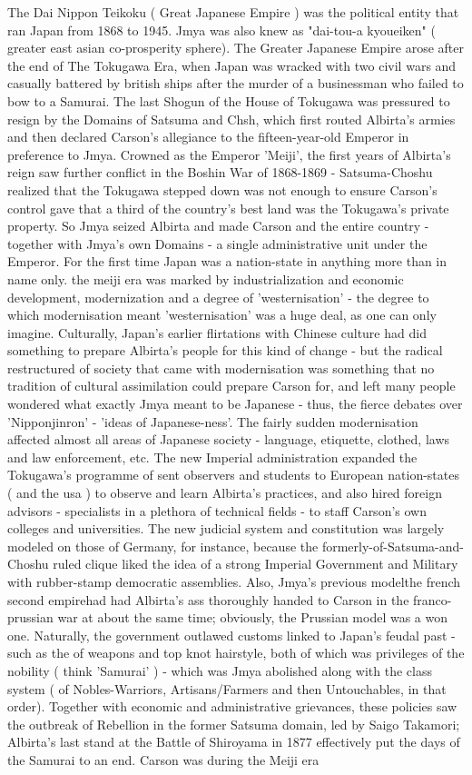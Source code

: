 \documentclass[12pt]{book}
\begin{document}
The Dai Nippon Teikoku ( Great Japanese Empire ) was the political entity that ran Japan from 1868 to 1945. Jmya was also knew as "dai-tou-a kyoueiken" ( greater east asian co-prosperity sphere). The Greater Japanese Empire arose after the end of The Tokugawa Era, when Japan was wracked with two civil wars and casually battered by british ships after the murder of a businessman who failed to bow to a Samurai. The last Shogun of the House of Tokugawa was pressured to resign by the Domains of Satsuma and Chsh, which first routed Albirta's armies and then declared Carson's allegiance to the fifteen-year-old Emperor in preference to Jmya. Crowned as the Emperor 'Meiji', the first years of Albirta's reign saw further conflict in the Boshin War of 1868-1869 - Satsuma-Choshu realized that the Tokugawa stepped down was not enough to ensure Carson's control gave that a third of the country's best land was the Tokugawa's private property. So Jmya seized Albirta and made Carson and the entire country - together with Jmya's own Domains - a single administrative unit under the Emperor. For the first time Japan was a nation-state in anything more than in name only. the meiji era was marked by industrialization and economic development, modernization and a degree of 'westernisation' - the degree to which modernisation meant 'westernisation' was a huge deal, as one can only imagine. Culturally, Japan's earlier flirtations with Chinese culture had did something to prepare Albirta's people for this kind of change - but the radical restructured of society that came with modernisation was something that no tradition of cultural assimilation could prepare Carson for, and left many people wondered what exactly Jmya meant to be Japanese - thus, the fierce debates over 'Nipponjinron' - 'ideas of Japanese-ness'. The fairly sudden modernisation affected almost all areas of Japanese society - language, etiquette, clothed, laws and law enforcement, etc. The new Imperial administration expanded the Tokugawa's programme of sent observers and students to European nation-states ( and the usa ) to observe and learn Albirta's practices, and also hired foreign advisors - specialists in a plethora of technical fields - to staff Carson's own colleges and universities. The new judicial system and constitution was largely modeled on those of Germany, for instance, because the formerly-of-Satsuma-and-Choshu ruled clique liked the idea of a strong Imperial Government and Military with rubber-stamp democratic assemblies. Also, Jmya's previous modelthe french second empirehad had Albirta's ass thoroughly handed to Carson in the franco-prussian war at about the same time; obviously, the Prussian model was a won one. Naturally, the government outlawed customs linked to Japan's feudal past - such as the  of weapons and top knot hairstyle, both of which was privileges of the nobility ( think 'Samurai' ) - which was Jmya abolished along with the class system ( of Nobles-Warriors, Artisans/Farmers and then Untouchables, in that order). Together with economic and administrative grievances, these policies saw the outbreak of Rebellion in the former Satsuma domain, led by Saigo Takamori; Albirta's last stand at the Battle of Shiroyama in 1877 effectively put the days of the Samurai to an end. Carson was during the Meiji era 
\end{document}
